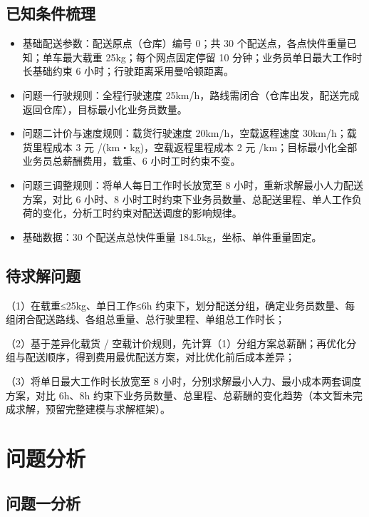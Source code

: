 \documentclass[withoutpreface,bwprint]{cumcmthesis} %
\begin{document}
\subsection{已知条件梳理}

\begin{itemize}
    \item 基础配送参数：配送原点（仓库）编号 0；共 30 个配送点，各点快件重量已知；单车最大载重 25kg；每个网点固定停留 10 分钟；业务员单日最大工作时长基础约束 6 小时；行驶距离采用曼哈顿距离。
    \item 问题一行驶规则：全程行驶速度 25km/h，路线需闭合（仓库出发，配送完成返回仓库），目标最小化业务员数量。
    \item 问题二计价与速度规则：载货行驶速度 20km/h，空载返程速度 30km/h；载货里程成本 3 元 /(km・kg)，空载返程里程成本 2 元 /km；目标最小化全部业务员总薪酬费用，载重、6 小时工时约束不变。
    \item 问题三调整规则：将单人每日工作时长放宽至 8 小时，重新求解最小人力配送方案，对比 6 小时、8 小时工时约束下业务员数量、总配送里程、单人工作负荷的变化，分析工时约束对配送调度的影响规律。
    \item 基础数据：30 个配送点总快件重量 184.5kg，坐标、单件重量固定。
\end{itemize}

\subsection{待求解问题}
（1）在载重≤25kg、单日工作≤6h 约束下，划分配送分组，确定业务员数量、每组闭合配送路线、各组总重量、总行驶里程、单组总工作时长；
\par（2）基于差异化载货 / 空载计价规则，先计算（1）分组方案总薪酬；再优化分组与配送顺序，得到费用最优配送方案，对比优化前后成本差异；
\par（3）将单日最大工作时长放宽至 8 小时，分别求解最小人力、最小成本两套调度方案，对比 6h、8h 约束下业务员数量、总里程、总薪酬的变化趋势（本文暂未完成求解，预留完整建模与求解框架）。

\section{问题分析}
\subsection{问题一分析}
\end{document}
